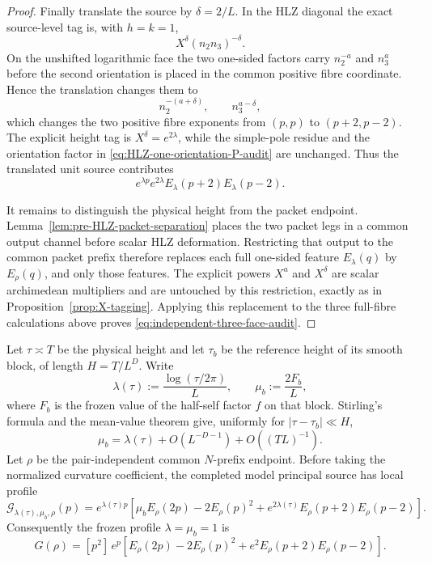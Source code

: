 \begin{proof}
Finally translate the source by $\delta=2/L$.  In the HLZ diagonal the exact
source-level tag is, with $h=k=1$,
\[
X^\delta(n_2n_3)^{-\delta}.
\]
On the unshifted logarithmic face the two one-sided factors carry
$n_2^{-a}$ and $n_3^{a}$ before the second orientation is placed in the common
positive fibre coordinate.  Hence the translation changes them to
\[
n_2^{-(a+\delta)},\qquad n_3^{a-\delta},
\]
which changes the two positive fibre exponents from $(p,p)$ to
$(p+2,p-2)$.  The explicit height tag is
$X^\delta=e^{2\lambda}$, while the simple-pole residue and the
orientation factor in \eqref{eq:HLZ-one-orientation-P-audit} are unchanged.
Thus the translated unit source contributes
\[
e^{\lambda p}e^{2\lambda}E_\lambda(p+2)E_\lambda(p-2).
\]

It remains to distinguish the physical height from the packet endpoint.
Lemma~\ref{lem:pre-HLZ-packet-separation} places the two packet legs in a common
output channel before scalar HLZ deformation.  Restricting that output to the
common packet prefix therefore replaces each full one-sided feature
$E_\lambda(q)$ by $E_\rho(q)$, and only those features.  The explicit powers
$X^a$ and $X^\delta$ are scalar archimedean multipliers and are untouched by
this restriction, exactly as in Proposition~\ref{prop:X-tagging}.  Applying
this replacement to the three full-fibre calculations above proves
\eqref{eq:independent-three-face-audit}.
\end{proof}

\begin{proposition}
\label{prop:completed-local-profile}
Let $\tau\asymp T$ be the physical height and let $\tau_b$ be the reference
height of its smooth block, of length $H=T/L^D$. Write
\[
\lambda(\tau):=\frac{\log(\tau/2\pi)}L,
\qquad
\mu_b:=\frac{2F_b}{L},
\]
where $F_b$ is the frozen value of the half-self factor $f$ on that block.
Stirling's formula and the mean-value theorem give, uniformly for
$|\tau-\tau_b|\ll H$,
\begin{equation}
\mu_b=\lambda(\tau)+O(L^{-D-1})+O((TL)^{-1}).
\label{eq:mu-lambda-close}
\end{equation}
Let $\rho$ be the pair-independent common $N$-prefix endpoint. Before taking
the normalized curvature coefficient, the completed model principal source has
local profile
\begin{equation}
\boxed{
\mathscr G_{\lambda(\tau),\mu_b,\rho}(p)
=e^{\lambda(\tau)p}\left[
\mu_b E_\rho(2p)-2E_\rho(p)^2
+e^{2\lambda(\tau)}E_\rho(p+2)E_\rho(p-2)
\right].
}
\label{eq:two-parameter-profile}
\end{equation}
Consequently the frozen profile $\lambda=\mu_b=1$ is
\begin{equation}
\boxed{
G(\rho)=[p^2]\,e^p\left[
E_\rho(2p)-2E_\rho(p)^2
+e^2E_\rho(p+2)E_\rho(p-2)
\right].
}
\label{eq:G-from-source}
\end{equation}
\end{proposition}

